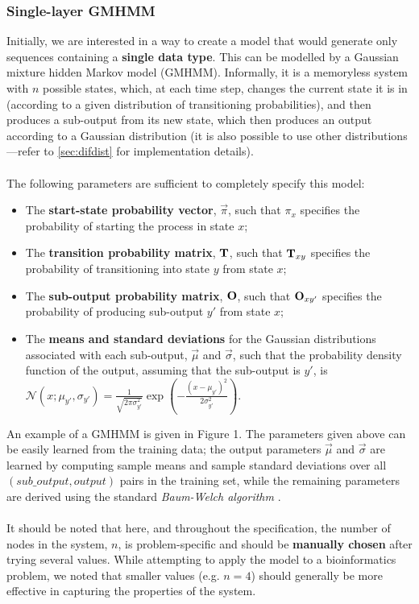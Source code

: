 \documentclass[12pt]{article}
\begin{document}
	\subsubsection{Single-layer GMHMM}
	
	Initially, we are interested in a way to create a model that would generate only sequences containing a {\bf single data type}. This can be modelled by a Gaussian mixture hidden Markov model (GMHMM). Informally, it is a memoryless system with $n$ possible states, which, at each time step, changes the current state it is in (according to a given distribution of transitioning probabilities), and then produces a sub-output from its new state, which then produces an output according to a Gaussian distribution (it is also possible to use other distributions---refer to \cref{sec:difdist} for implementation details).\\ \\
	The following parameters are sufficient to completely specify this model:
	\begin{itemize}
		\item The \textbf{start-state probability vector}, $\vec{\pi}$, such that $\pi_x$ specifies the probability of starting the process in state $x$;
		\item The \textbf{transition probability matrix}, $\bf T$, such that ${\bf T}_{xy}$ specifies the probability of transitioning into state $y$ from state $x$;
		\item The \textbf{sub-output probability matrix}, $\bf O$, such that ${\bf O}_{xy'}$ specifies the probability of producing sub-output $y'$ from state $x$;
		\item The \textbf{means and standard deviations} for the Gaussian distributions associated with each sub-output, $\vec{\mu}$ and $\vec{\sigma}$, such that the probability density function of the output, assuming that the sub-output is $y'$, is $\mathcal{N}(x; \mu_{y'}, \sigma_{y'}) = \frac{1}{\sqrt{2\pi\sigma_{y'}^2}}\exp\left(-\frac{(x - \mu_{y'})^2}{2\sigma_{y'}^2}\right)$.
	\end{itemize}
	An example of a GMHMM is given in Figure 1. The parameters given above can be easily learned from the training data; the output parameters $\vec{\mu}$ and $\vec{\sigma}$ are learned by computing sample means and sample standard deviations over all $(sub\_output, output)$ pairs in the training set, while the remaining parameters are derived using the standard \emph{Baum-Welch algorithm} \cite{Rabiner89}.\\ \\
	It should be noted that here, and throughout the specification, the number of nodes in the system, $n$, is problem-specific and should be {\bf manually chosen} after trying several values. While attempting to apply the model to a bioinformatics problem, we noted that smaller values (e.g. $n = 4$) should generally be more effective in capturing the properties of the system.
	
\end{document}

